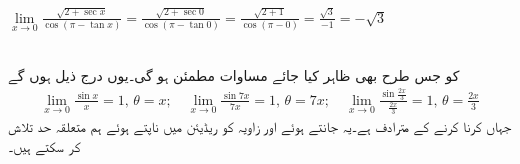 $\lim\limits_{x\to 0} \frac{\sqrt{2+\sec x}}{\cos(\pi-\tan x)}=\frac{\sqrt{2+\sec 0}}{\cos(\pi-\tan 0)}=\frac{\sqrt{2+1}}{\cos(\pi-0)}=\frac{\sqrt{3}}{-1}=-\sqrt{3}$

\\
 کو جس طرح بھی ظاہر کیا جائے مساوات  مطمئن ہو گی۔یوں درج ذیل ہوں گے
\begin{align*}
\lim_{x\to 0}\frac{\sin x}{x}=1,\, \theta=x;\quad  \lim_{x\to 0}\frac{\sin 7x}{7x}=1,\, \theta=7x; \quad \lim_{x\to0} \frac{\sin \tfrac{2x}{3}}{\tfrac{2x}{3}}=1,\,\theta=\tfrac{2x}{3}
\end{align*}
جہاں  کرنا  کرنے  کے مترادف ہے۔یہ جانتے ہوئے اور زاویہ کو ریڈیئن میں ناپتے ہوئے ہم متعلقہ حد تلاش کر سکتے ہیں۔

